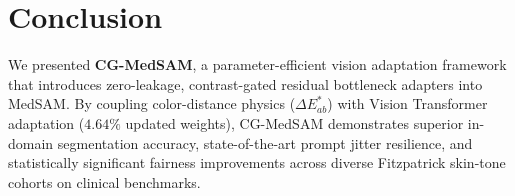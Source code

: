 \documentclass[runningheads]{llncs}
\begin{document}
\section{Conclusion}
We presented \textbf{CG-MedSAM}, a parameter-efficient vision adaptation framework that introduces zero-leakage, contrast-gated residual bottleneck adapters into MedSAM. By coupling color-distance physics ($\Delta E^*_{ab}$) with Vision Transformer adaptation ($4.64\%$ updated weights), CG-MedSAM demonstrates superior in-domain segmentation accuracy, state-of-the-art prompt jitter resilience, and statistically significant fairness improvements across diverse Fitzpatrick skin-tone cohorts on clinical benchmarks.



\end{document}

